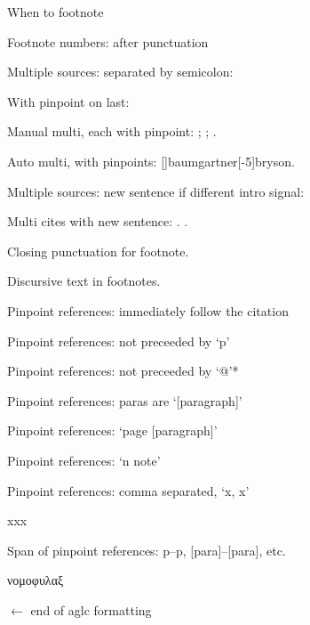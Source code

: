 {
\renewcommand\lguide{aglc}





 When to footnote

 Footnote numbers: after punctuation

 Multiple sources: separated by semicolon:


With pinpoint on last: 

Manual multi, each with pinpoint: ; ; .

Auto multi, with pinpoints: []{baumgartner}[-5]{bryson}.


 Multiple sources: new sentence if different intro signal:

Multi cites with new sentence: . .

 Closing punctuation for footnote.

 Discursive text in footnotes.

 Pinpoint references: immediately follow the citation

 Pinpoint references: not preceeded by `p'

 Pinpoint references: not preceeded by `@'*

 Pinpoint references: paras are `[paragraph]'

 Pinpoint references: `page [paragraph]'

 Pinpoint references: `n note'

 Pinpoint references: comma separated, `x, x'

xxx




 Span of pinpoint references: p--p, [para]--[para], etc.

νομοφυλαξ

}$\leftarrow$ end of aglc formatting

